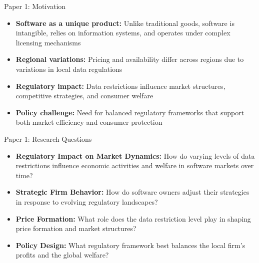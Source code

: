 \documentclass[10pt,aspectratio=169]{beamer}
\begin{document}
\begin{frame}{Paper 1: Motivation}
\begin{itemize}
    \item \textbf{Software as a unique product:} Unlike traditional goods, software is intangible, relies on information systems, and operates under complex licensing mechanisms
    
    \vspace{2mm}
    \item \textbf{Regional variations:} Pricing and availability differ across regions due to variations in local data regulations
    
    \vspace{2mm}
    \item \textbf{Regulatory impact:} Data restrictions influence market structures, competitive strategies, and consumer welfare
    
    \vspace{2mm}
    \item \textbf{Policy challenge:} Need for balanced regulatory frameworks that support both market efficiency and consumer protection
\end{itemize}
\end{frame}

\begin{frame}{Paper 1: Research Questions}
\begin{itemize}
    \item \textbf{Regulatory Impact on Market Dynamics:}  
    How do varying levels of data restrictions influence economic activities and welfare in software markets over time?

    \vspace{2mm}
    \item \textbf{Strategic Firm Behavior:}  
    How do software owners adjust their strategies in response to evolving regulatory landscapes?

    \vspace{2mm}
    \item \textbf{Price Formation:}  
    What role does the data restriction level play in shaping price formation and market structures?

    \vspace{2mm}
    \item \textbf{Policy Design:}  
    What regulatory framework best balances the local firm's profits and the global welfare?
\end{itemize}
\end{frame}
\end{document}
